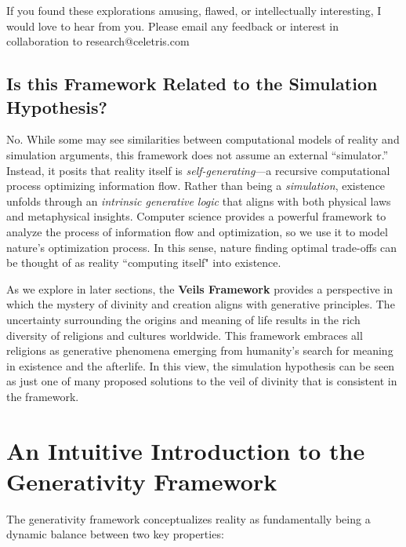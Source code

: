 \documentclass[12pt]{article}
\begin{document}
If you found these explorations amusing, flawed, or intellectually interesting, I would love to hear from you. Please email any feedback or interest in collaboration to research@celetris.com

\subsection{Is this Framework Related to the Simulation Hypothesis?}
No. While some may see similarities between computational models of reality and simulation arguments, this framework does not assume an external “simulator.” Instead, it posits that reality itself is \textit{self-generating}—a recursive computational process optimizing information flow. Rather than being a \textit{simulation}, existence unfolds through an \textit{intrinsic generative logic} that aligns with both physical laws and metaphysical insights. Computer science provides a powerful framework to analyze the process of information flow and optimization, so we use it to model nature's optimization process. In this sense, nature finding optimal trade-offs can be thought of as reality ``computing itself" into existence.

As we explore in later sections, the \textbf{Veils Framework} provides a perspective in which the mystery of divinity and creation aligns with generative principles. The uncertainty surrounding the origins and meaning of life results in the rich diversity of religions and cultures worldwide. This framework embraces all religions as generative phenomena emerging from humanity's search for meaning in existence and the afterlife. In this view, the simulation hypothesis can be seen as just one of many proposed solutions to the veil of divinity that is consistent in the framework.


\section{An Intuitive Introduction to the Generativity Framework}
The generativity framework conceptualizes reality as fundamentally being a dynamic balance between two key properties:
\end{document}
